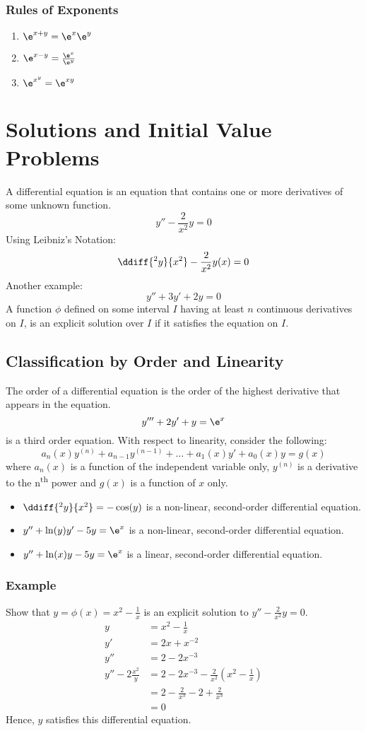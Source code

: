 \documentclass{math}
\begin{document}
\subsubsection*{Rules of Exponents}
\begin{enumerate}
  \item \( \e^{x+y} = \e^x\e^y \)
  \item \( \e^{x-y} = \frac{\e^x}{\e^y} \)
  \item \( \e^{x^y} = \e^{xy} \)
\end{enumerate}

\clearpage
\section*{Solutions and Initial Value Problems}
A differential equation is an equation that contains one or more derivatives of
some unknown function.
\[ y''-\frac{2}{x^2}y = 0 \]
Using Leibniz's Notation:
\[ \ddiff{^2y}{x^2}-\frac{2}{x^2}y(x) = 0 \]
Another example:
\[ y''+3y'+2y = 0 \]
A function \( \phi \) defined on some interval \( I \) having at least \( n \)
continuous derivatives on \( I \), is an explicit solution over \( I \) if it
satisfies the equation on \( I \).

\subsection*{Classification by Order and Linearity}
The order of a differential equation is the order of the highest derivative that
appears in the equation.
\[ y'''+2y'+y = \e^x \]
is a third order equation. With respect to linearity, consider the following:
\[ a_n(x)y^{(n)}+a_{n-1}y^{(n-1)}+\dots+a_1(x)y'+a_0(x)y = g(x) \]
where \( a_n(x) \) is a function of the independent variable only,
\( y^{(n)} \) is a derivative to the n\textsuperscript{th} power and \( g(x) \)
is a function of \( x \) only.
\begin{itemize}
  \item \( \ddiff{^2y}{x^2} = -\cos(y) \) is a non-linear, second-order
  differential equation.
  \item \( y''+\ln(y)y'-5y = \e^x \) is a non-linear, second-order differential
  equation.
  \item \( y''+\ln(x)y-5y = \e^x \) is a linear, second-order differential
  equation.
\end{itemize}

\subsubsection*{Example}
Show that \( y = \phi(x) = x^2-\frac{1}{x} \) is an explicit solution to
\( y''-\frac{2}{x^2}y = 0 \).
\begin{align*}
  y &= x^2-\frac{1}{x} \\
  y' &= 2x+x^{-2} \\
  y'' &= 2-2x^{-3} \\
  y''-2\frac{x^2}y &= 2-2x^{-3}-\frac{2}{x^2}(x^2-\frac{1}{x}) \\
  &= 2-\frac{2}{x^3}-2+\frac{2}{x^3} \\
  &= 0
\end{align*}
Hence, \( y \) satisfies this differential equation.
\end{document}
